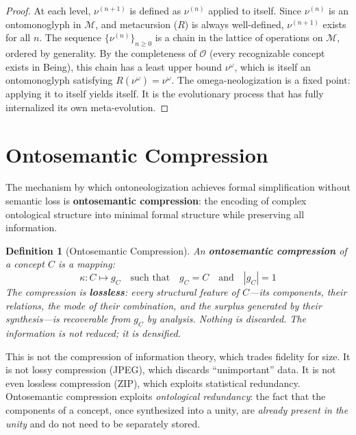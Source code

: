 \documentclass[12pt, letterpaper]{book}
\def\equiv{=}%
\def\circlearrowleft{R}%
\def\mathfrak#1{#1}%
\newtheorem{definition}{Definition}[chapter]
\begin{document}
\begin{proof}
At each level, $\nu^{(n+1)}$ is defined as $\nu^{(n)}$ applied to itself. Since $\nu^{(n)}$ is an ontomonoglyph in $\mathcal{M}$, and metacursion ($\circlearrowleft$) is always well-defined, $\nu^{(n+1)}$ exists for all $n$. The sequence $\{\nu^{(n)}\}_{n \geq 0}$ is a chain in the lattice of operations on $\mathcal{M}$, ordered by generality. By the completeness of $\mathcal{O}$ (every recognizable concept exists in Being), this chain has a least upper bound $\nu^\omega$, which is itself an ontomonoglyph satisfying $\circlearrowleft(\nu^\omega) \equiv \nu^\omega$. The omega-neologization is a fixed point: applying it to itself yields itself. It is the evolutionary process that has fully internalized its own meta-evolution.
\end{proof}


\section{Ontosemantic Compression}

The mechanism by which ontoneologization achieves formal simplification without semantic loss is \textbf{ontosemantic compression}: the encoding of complex ontological structure into minimal formal structure while preserving all information.

\begin{definition}[Ontosemantic Compression]\label{def:ontosemantic}
An \textbf{ontosemantic compression} of a concept $C$ is a mapping:
\[
\kappa: C \mapsto \mathfrak{g}_C \quad \text{such that} \quad \mathfrak{g}_C \equiv C \quad \text{and} \quad |\mathfrak{g}_C| \equiv 1
\]
The compression is \textbf{lossless}: every structural feature of $C$---its components, their relations, the mode of their combination, and the surplus generated by their synthesis---is recoverable from $\mathfrak{g}_C$ by analysis. Nothing is discarded. The information is not reduced; it is \textit{densified}.
\end{definition}

This is not the compression of information theory, which trades fidelity for size. It is not lossy compression (JPEG), which discards ``unimportant'' data. It is not even lossless compression (ZIP), which exploits statistical redundancy. Ontosemantic compression exploits \textit{ontological redundancy}: the fact that the components of a concept, once synthesized into a unity, are \textit{already present in the unity} and do not need to be separately stored.
\end{document}
